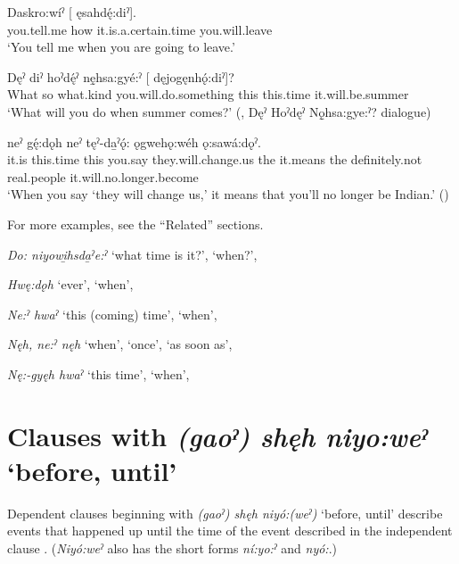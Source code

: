 \ea\label{ex:when3}
\gll Daskro:wíˀ [   ęsahdę́:diˀ]. \\
you.tell.me how it.is.a.certain.time you.will.leave\\
\glt ‘You tell me when you are going to leave.’ 
\z

\ea\label{ex:when4}
\gll Dęˀ diˀ hoˀdę́ˀ nę̱hsa:gyé:ˀ [   dęjogęnhǫ́:diˀ]?\\
What so what.kind you.will.do.something this this.time it.will.be.summer\\
\glt ‘What will you do when summer comes?’ (\cite[349]{mithun_watewayestanih_1984}, Dęˀ Hoˀdęˀ Nǫ̱hsa:gye:ˀ? dialogue)
\z

\ea\label{ex:when5}
 neˀ gę́:dǫh neˀ tęˀ-da̱ˀǫ́: ǫgwehǫ:wéh ǫ:sawá:dǫˀ.\\
it.is this.time this you.say they.will.change.us the it.means the definitely.not real.people it.will.no.longer.become\\
\glt ‘When you say ‘they will change us,’ it means that you’ll no longer be Indian.’ (\cite{henry_de_2005})
\z

For more examples, see the “Related” sections.

\begin{CayugaRelated}
\item{}\textit{Do: niyowi̱hsda̱ˀe:ˀ} ‘what time is it?’, ‘when?’, 

\item{}\textit{Hwę:dǫh} ‘ever’, ‘when’, 

\item{}\textit{Ne:ˀ hwaˀ} ‘this (coming) time’, ‘when’, 

\item{}\textit{Nęh, ne:ˀ nęh} ‘when’, ‘once’, ‘as soon as’, 

\item{}\textit{Nę:-gyęh hwaˀ} ‘this time’, ‘when’, 
\end{CayugaRelated}


\section{Clauses with \textit{(gaoˀ) shęh niyo:weˀ} ‘before, until’} \label{ch:Clauses with [(gaoˀ) shęh niyo:weˀ] ‘before, until’}
Dependent clauses beginning with \textit{(gaoˀ) shęh niyó:(weˀ)} ‘before, until’ describe events that happened up until the time of the event described in the independent clause . (\textit{Niyó:weˀ} also has the short forms \textit{ní:yo:ˀ} and \textit{nyó:}.)

